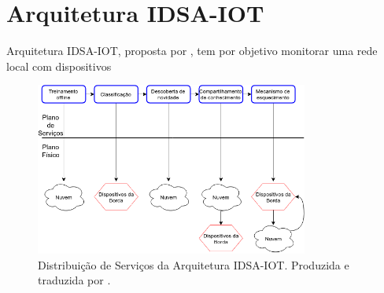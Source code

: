 \section{Arquitetura IDSA-IOT}\label{sec:cassales}

\newcommand{\idsiot}{IDSA-IOT\xspace}

Arquitetura IDSA-IOT, proposta por , tem por objetivo
monitorar uma rede local com dispositivos


\begin{figure}[ht]
\centering
\includegraphics[width=0.8\textwidth]{figuras/cassales-service-physical-pt.png}
\caption{Distribuição de Serviços da Arquitetura \idsiot.
Produzida e traduzida por .}
\label{fig:ids-iot}
\end{figure}




